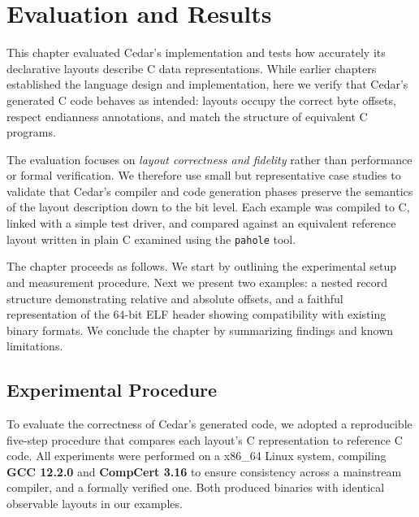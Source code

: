 \section{Evaluation and Results}
This chapter evaluated Cedar's implementation and tests how accurately
its declarative layouts describe C data representations.
While earlier chapters established the language design and implementation,
here we verify that Cedar's generated C code behaves as intended:
layouts occupy the correct byte offsets, respect endianness annotations, and
match the structure of equivalent C programs.

The evaluation focuses on \textit{layout correctness and fidelity} rather
than performance or formal verification. We therefore use small
but representative case studies to validate that Cedar's compiler and
code generation phases preserve the semantics of the layout description
down to the bit level.
Each example was compiled to C, linked with a simple test driver, and compared
against an equivalent reference layout written in plain C examined using the
\texttt{pahole} tool.

The chapter proceeds as follows.
We start by outlining the experimental setup and measurement procedure.
Next we present two examples: a nested record structure demonstrating relative
and absolute offsets, and a faithful representation of the 64-bit ELF header
showing compatibility with existing binary formats.
We conclude the chapter by summarizing findings and known limitations.

\subsection{Experimental Procedure}
To evaluate the correctness of Cedar's generated code, we adopted
a reproducible five-step procedure that compares each layout's C representation
to reference C code.
All experiments were performed on a x86\_64 Linux system, compiling
\textbf{GCC 12.2.0} and \textbf{CompCert 3.16} to ensure consistency
across a mainstream compiler, and a formally verified one.
Both produced binaries with identical observable layouts in our examples.

